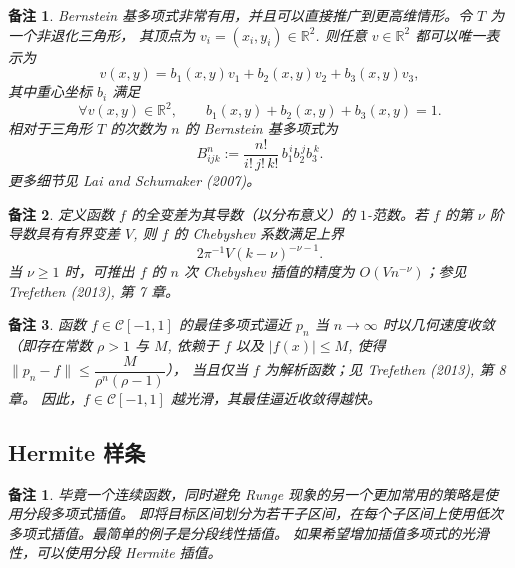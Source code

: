\documentclass[a4paper]{ctexart}
\newtheorem{remark}{备注}
\newtheorem*{remark*}{备注}
\numberwithin{theorem}{section}
\numberwithin{equation}{section}
\numberwithin{figure}{section}
\numberwithin{remark}{section}
\begin{document}
\begin{remark}
Bernstein 基多项式非常有用，并且可以直接推广到更高维情形。令 $T$ 为一个非退化三角形，
其顶点为 $v_i=(x_i,y_i)\in\mathbb{R}^2$. 则任意 $v\in\mathbb{R}^2$ 都可以唯一表示为
\begin{equation*}
v(x,y)=b_1(x,y)v_1+b_2(x,y)v_2+b_3(x,y)v_3,
\end{equation*}
其中重心坐标 $b_i$ 满足
\begin{equation*}
\forall v(x,y)\in\mathbb{R}^2,\qquad b_1(x,y)+b_2(x,y)+b_3(x,y)=1.
\end{equation*}
相对于三角形 $T$ 的次数为 $n$ 的 Bernstein 基多项式为
\begin{equation*}
B^{n}_{ijk}:=\frac{n!}{i!\,j!\,k!}\, b_1^{\,i} b_2^{\,j} b_3^{\,k}.
\end{equation*}
更多细节见 Lai and Schumaker (2007)。
\end{remark}

\begin{remark}
定义函数 $f$ 的全变差为其导数（以分布意义）的 $1$-范数。若 $f$ 的第 $\nu$ 阶导数具有有界变差 $V$, 
则 $f$ 的 Chebyshev 系数满足上界
\begin{equation*}
2\pi^{-1} V (k-\nu)^{-\nu-1}.
\end{equation*}
当 $\nu\ge 1$ 时，可推出 $f$ 的 $n$ 次 Chebyshev 插值的精度为 $O(V n^{-\nu})$；参见 Trefethen (2013), 第 7 章。
\end{remark}

\begin{remark}
函数 $f\in\mathcal{C}[-1,1]$ 的最佳多项式逼近 $p_n$ 当 $n\to\infty$ 时以几何速度收敛
（即存在常数 $\rho>1$ 与 $M$, 依赖于 $f$ 以及 $|f(x)|\le M$, 使得
$\lVert p_n-f\rVert \le \dfrac{M}{\rho^{n}(\rho-1)}$），
当且仅当 $f$ 为解析函数；见 Trefethen (2013), 第 8 章。
因此，$f\in\mathcal{C}[-1,1]$ 越光滑，其最佳逼近收敛得越快。
\end{remark}

\subsection{Hermite 样条}

\begin{remark*}
    毕竟一个连续函数，同时避免 Runge 现象的另一个更加常用的策略是使用分段多项式插值。
即将目标区间划分为若干子区间，在每个子区间上使用低次多项式插值。最简单的例子是分段线性插值。
如果希望增加插值多项式的光滑性，可以使用分段 Hermite 插值。
\end{remark*}    
\end{document}
